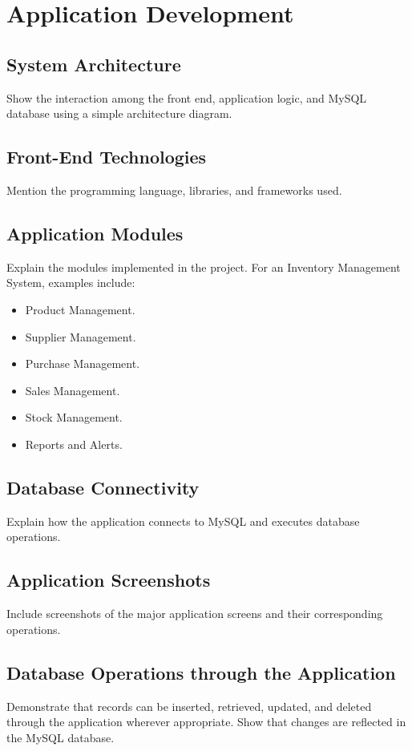 \documentclass[12pt,a4paper]{report}
\begin{document}
\chapter{Application Development}

\section{System Architecture}
Show the interaction among the front end, application logic, and MySQL database using a simple architecture diagram.

\section{Front-End Technologies}
Mention the programming language, libraries, and frameworks used.

\section{Application Modules}
Explain the modules implemented in the project. For an Inventory Management System, examples include:
\begin{itemize}
    \item Product Management.
    \item Supplier Management.
    \item Purchase Management.
    \item Sales Management.
    \item Stock Management.
    \item Reports and Alerts.
\end{itemize}

\section{Database Connectivity}
Explain how the application connects to MySQL and executes database operations.

\section{Application Screenshots}
Include screenshots of the major application screens and their corresponding operations.

\section{Database Operations through the Application}
Demonstrate that records can be inserted, retrieved, updated, and deleted through the application wherever appropriate. Show that changes are reflected in the MySQL database.
\end{document}
